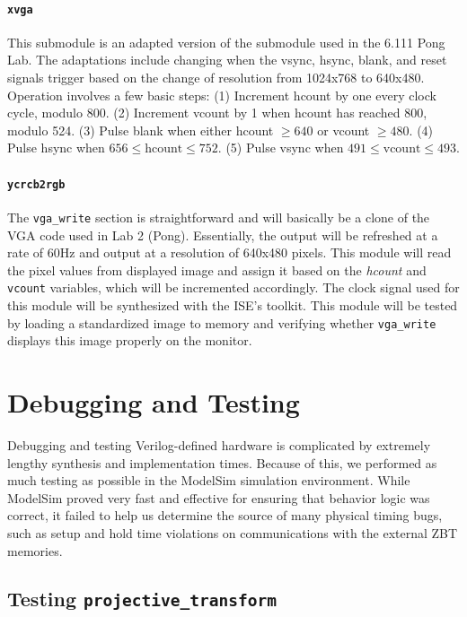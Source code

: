 \documentclass[10pt]{article}
\begin{document}
\paragraph{{\tt xvga}}
This submodule is an adapted version of the submodule used in the 6.111 Pong Lab. The adaptations include changing when the vsync, hsync, blank, and reset signals trigger based on the change of resolution from 1024x768 to 640x480. Operation involves a few basic steps\cite{xvga}: (1) Increment hcount by one every clock cycle, modulo 800. (2) Increment vcount by 1 when hcount has reached 800, modulo 524. (3) Pulse blank when either hcount $\geq 640$ or vcount $\geq 480$. (4) Pulse hsync when $656 \leq \text{hcount} \leq 752$. (5) Pulse vsync when $491 \leq \text{vcount} \leq 493$.

\paragraph{{\tt ycrcb2rgb}}


The {\tt vga\_write} section is straightforward and will basically be a clone of the VGA code used in Lab 2 (Pong). Essentially, the output will be refreshed at a rate of 60Hz and output at a resolution of 640x480 pixels. This module will read the pixel values from displayed image and assign it based on the {\it hcount} and {\tt vcount} variables, which will be incremented accordingly. The clock signal used for this module will be synthesized with the ISE's toolkit. This module will be tested by loading a standardized image to memory and verifying whether {\tt vga\_write} displays this image properly on the monitor.

\section{Debugging and Testing}

Debugging and testing Verilog-defined hardware is complicated by extremely lengthy synthesis and implementation times. Because of this, we performed as much testing as possible in the ModelSim simulation environment. While ModelSim proved very fast and effective for ensuring that behavior logic was correct, it failed to help us determine the source of many physical timing bugs, such as setup and hold time violations on communications with the external ZBT memories.

\subsection{Testing {\tt projective\_transform}}
\end{document}
